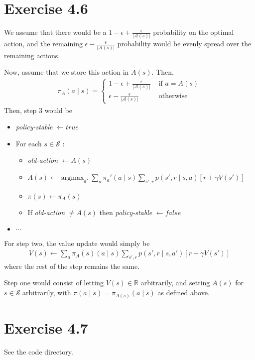 \documentclass[a4paper,11pt,reqno]{amsart}
\newcounter{prob_counter}
\begin{document}
\section*{Exercise 4.6}
We assume that there would be a $1 - \epsilon + \frac{\epsilon}{|\mathcal{A}(s)|}$ probability on the optimal action, and the remaining $\epsilon - \frac{\epsilon}{|\mathcal{A}(s)|}$ probability would be evenly spread over the remaining actions. 

Now, assume that we store this action in $A(s)$. Then,
 \begin{align}
\pi_A (a \mid s) = 
\begin{cases}
    1 - \epsilon+\frac{\epsilon}{|\mathcal{A}(s)|} & \text{ if } a = A(s)\\
    \epsilon - \frac{\epsilon}{|\mathcal{A}(s)|} & \text{ otherwise } 
\end{cases}
\end{align}
Then, step 3 would be
\begin{itemize}
    \item \emph{policy-stable} $\leftarrow true$
    \item For each $s \in \mathcal{S}$ :
    \begin{itemize}
        \item \emph{old-action} $\leftarrow A(s)$
        \item $A(s) \leftarrow  \operatorname{argmax}_{a'}\sum_{a}\pi _a'(a \mid s) \sum_{s', r} p(s', r \mid s, a)\left[ r + \gamma V(s') \right]  $
        \item $\pi(s) \leftarrow \pi_A(s)$
        \item If \emph{old-action} $\neq A(s)$ then \emph{policy-stable} $\leftarrow false$
    \end{itemize}
    \item $\cdots $
\end{itemize}

For step two, the value update would simply be
\begin{align}
V(s) \leftarrow \sum_{a}\pi_A(s)(a \mid s) \sum_{s', r} p(s', r \mid s, a') \left[ r + \gamma V(s') \right]  
\end{align}
where the rest of the step remains the same.

Step one would consist of letting $V(s) \in  \mathbb{R}$ arbitrarily, and setting $A(s)$ for $s \in  \mathcal{S}$ arbitrarily, with $\pi (a \mid s) = \pi _{A(s)}(a \mid s)$ as defined above.

\section*{Exercise 4.7}
See the code directory.
\end{document}
